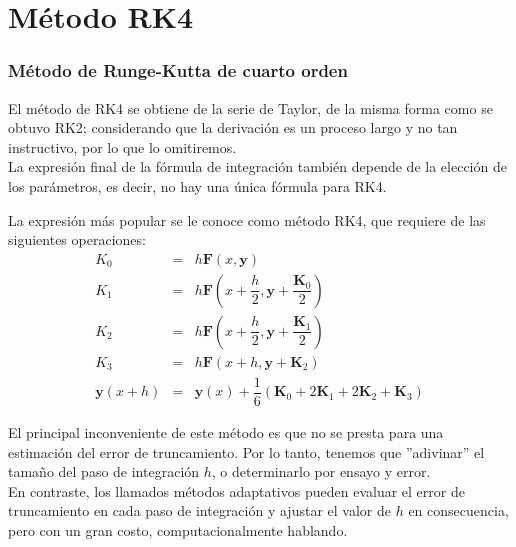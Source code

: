 \section{Método RK4}
\begin{frame}
\frametitle{Método de Runge-Kutta de cuarto orden}
El método de RK4 se obtiene de la serie de Taylor, de la misma forma como se obtuvo RK2; considerando que la derivación es un proceso largo y no tan instructivo, por lo que lo omitiremos.
\\
\medskip
La expresión final de la fórmula de integración también depende de la elección de los parámetros, es decir, no hay una única fórmula para RK4.
\end{frame}
\begin{frame}
La expresión más popular se le conoce como método RK4, que requiere de las siguientes operaciones:
\begin{eqnarray*}
K_{0} &=& h \mathbf{F}(x,\mathbf{y}) \\
K_{1} &=& h \mathbf{F}(x +\dfrac{h}{2},\mathbf{y} + \dfrac{\mathbf{K}_{0}}{2}) \\
K_{2} &=& h \mathbf{F}(x +\dfrac{h}{2},\mathbf{y} + \dfrac{\mathbf{K}_{1}}{2}) \\
K_{3} &=& h \mathbf{F}(x +h, \mathbf{y} + \mathbf{K}_{2}) \\
\mathbf{y}(x+h) &=& \mathbf{y}(x) + \dfrac{1}{6} (\mathbf{K}_{0} + 2 \mathbf{K}_{1} + 2 \mathbf{K}_{2} + \mathbf{K}_{3})
\end{eqnarray*}
\end{frame}
\begin{frame}
El principal inconveniente de este método es que no se presta para una estimación del error de truncamiento. Por lo tanto, tenemos que ''adivinar'' el tamaño del paso de integración $h$, o determinarlo por ensayo y error.
\\
\medskip
En contraste, los llamados métodos adaptativos pueden evaluar el error de truncamiento en cada paso de integración y ajustar el valor de $h$ en consecuencia, pero con un gran costo, computacionalmente hablando.
\end{frame}
